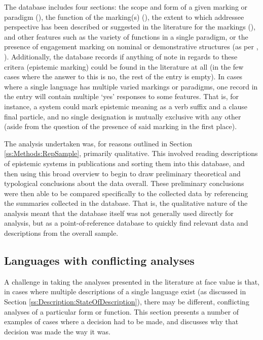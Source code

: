 The database includes four sections: the scope and form of a given marking or paradigm (), the function of the marking(s) (), the extent to which addressee perspective has been described or suggested in the literature for the markings (), and other features such as the variety of functions in a single paradigm, or the presence of engagement marking on nominal or demonstrative structures (as per , ). Additionally, the database records if anything of note in regards to these critera (epistemic marking) could be found in the literature at all (in the few cases where the answer to this is no, the rest of the entry is empty). In cases where a single language has multiple varied markings or paradigms, one record in the entry will contain multiple `yes' responses to some features. That is, for instance, a system could mark epistemic meaning as a verb suffix and a clause final particle, and no single designation is mutually exclusive with any other (aside from the question of the presence of said marking in the first place).

The analysis undertaken was, for reasons outlined in Section \ref{ss:Methods:RepSample}, primarily qualitative. This involved reading descriptions of epistemic systems in publications and sorting them into this database, and then using this broad overview to begin to draw preliminary theoretical and typological conclusions about the data overall. These preliminary conclusions were then able to be compared specifically to the collected data by referencing the summaries collected in the database. That is, the qualitative nature of the analysis meant that the database itself was not generally used directly for analysis, but as a point-of-reference database to quickly find relevant data and descriptions from the overall sample.

\subsection{Languages with conflicting analyses}\label{ss:Description:Conflicts}
A challenge in taking the analyses presented in the literature at face value is that, in cases where multiple descriptions of a single language exist (as discussed in Section \ref{ss:Description:StateOfDescription}), there may be different, conflicting analyses of a particular form or function. This section presents a number of examples of cases where a decision had to be made, and discusses why that decision was made the way it was. 

